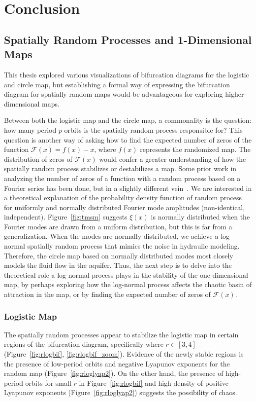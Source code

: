 \chapter{Conclusion}
\section{Spatially Random Processes and 1-Dimensional Maps}
This thesis explored various visualizations of bifurcation diagrams
for the logistic and circle map, but establishing a formal way of
expressing the bifurcation diagram for spatially random maps would
be advantageous for exploring higher-dimensional maps.

Between both the logistic map and the circle map, a commonality is the
question: how many period $p$ orbits is the spatially random process
responsible for? This question is another way of asking how to find
the expected number of zeros of the function $\mathcal{F}(x)=f(x)-x$, where $f(x)$ represents the
randomized map. The distribution of zeros of
$\mathcal{F}(x)$ would confer a greater understanding of how the
spatially random process stabilizes or destabilizes a map. Some prior
work in analyzing the number of zeros of a function with a random
process based on a Fourier series has been done, but in a slightly
different vein~\cite{kahane}. We are interested in a theoretical
explanation of the probability density function of random process for
uniformly and normally distributed Fourier mode amplitudes
(non-identical, independent). Figure~\ref{fig:tmsm} suggests $\xi(x)$
is normally distributed when the Fourier modes are drawn from a
uniform distribution, but this is far from a generalization. When the
modes are normally distributed, we achieve a log-normal spatially
random process that mimics the noise in hydraulic modeling. Therefore,
the circle
map based on normally distributed modes most closely models the fluid
flow in the aquifer. Thus, the
next step is to delve into the theoretical role a log-normal process plays in the
stability of the one-dimensional map, by perhaps exploring how the
log-normal process affects the chaotic basin of attraction in the map,
or by finding the expected number of zeros of $\mathcal{F}(x)$.

\subsection{Logistic Map}
The spatially random processes appear to stabilize the logistic map in
certain regions of the bifurcation diagram, specifically where $r \in [3,4]$
(Figure~\ref{fig:rlogbif}, \ref{fig:rlogbif_zoom}). Evidence of the
newly stable regions is the presence of low-period orbits and negative
Lyapunov exponents for the random map (Figure~\ref{fig:rloglyap2}). On
the other hand, the presence of high-period orbits for
small $r$ in Figure~\ref{fig:rlogbif} and high density of positive
Lyapunov exponents (Figure~\ref{fig:rloglyap2}) suggests the possibility of chaos.

